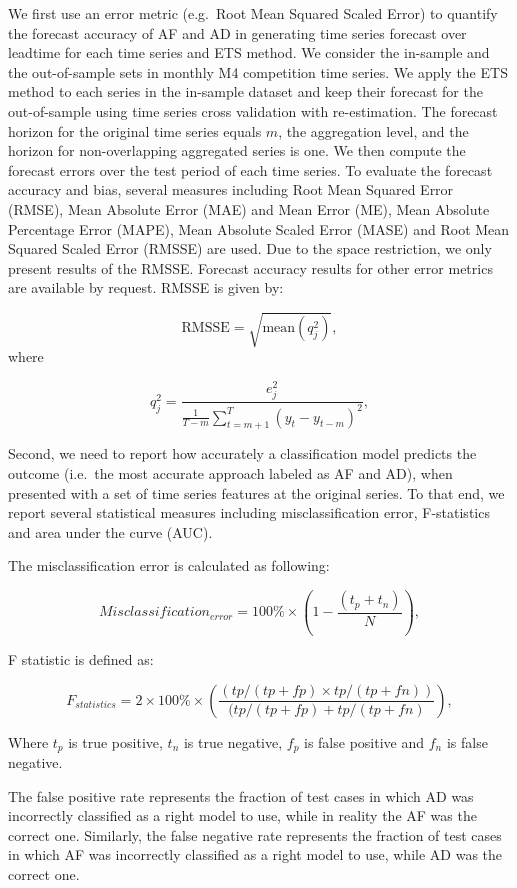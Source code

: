 \documentclass[]{elsarticle} %
\begin{document}
We first use an error metric (e.g.~Root Mean Squared Scaled Error) to
quantify the forecast accuracy of AF and AD in generating time series
forecast over leadtime for each time series and ETS method. We consider
the in-sample and the out-of-sample sets in monthly M4 competition time
series. We apply the ETS method to each series in the in-sample dataset
and keep their forecast for the out-of-sample using time series cross
validation with re-estimation. The forecast horizon for the original
time series equals \(m\), the aggregation level, and the horizon for
non-overlapping aggregated series is one. We then compute the forecast
errors over the test period of each time series. To evaluate the
forecast accuracy and bias, several measures including Root Mean Squared
Error (RMSE), Mean Absolute Error (MAE) and Mean Error (ME), Mean
Absolute Percentage Error (MAPE), Mean Absolute Scaled Error (MASE) and
Root Mean Squared Scaled Error (RMSSE) are used. Due to the space
restriction, we only present results of the RMSSE. Forecast accuracy
results for other error metrics are available by request. RMSSE is given
by:

\[ \text{RMSSE} = \sqrt{\text{mean}(q_{j}^2)},\] where

\[q^2_{j} = \frac{\displaystyle e^2_{j}}
    {\displaystyle\frac{1}{T-m}\sum_{t=m+1}^T (y_{t}-y_{t-m})^2},\]

Second, we need to report how accurately a classification model predicts
the outcome (i.e.~the most accurate approach labeled as AF and AD), when
presented with a set of time series features at the original series. To
that end, we report several statistical measures including
misclassification error, F-statistics and area under the curve (AUC).

The misclassification error is calculated as following:

\[Misclassification_{error} = 100\% \times \left( 1-\frac{(t_p+t_n)}{N}\right),\]

F statistic is defined as:

\[F_{statistics} = 2 \times 100\% \times \left(\frac{(tp/(tp+fp) \times tp/(tp+fn))}{(tp/(tp+fp)+tp/(tp+fn)}\right),\]

Where \(t_p\) is true positive, \(t_n\) is true negative, \(f_p\) is
false positive and \(f_n\) is false negative.

The false positive rate represents the fraction of test cases in which
AD was incorrectly classified as a right model to use, while in reality
the AF was the correct one. Similarly, the false negative rate
represents the fraction of test cases in which AF was incorrectly
classified as a right model to use, while AD was the correct one.
\end{document}
